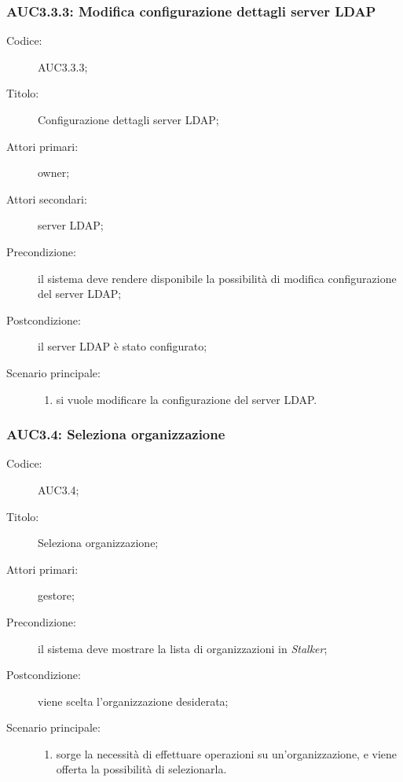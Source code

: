 \documentclass[../../../analisi-dei-requisiti.tex]{subfiles}
\begin{document}
\subsubsection{AUC3.3.3: Modifica configurazione dettagli server LDAP}%
\label{subs:AUC3.3.3}
\begin{description}
  \item[Codice:] AUC3.3.3;
  \item[Titolo:] Configurazione dettagli server LDAP\@;
  \item[Attori primari:] owner;
  \item[Attori secondari:] server LDAP\@;
  \item[Precondizione:] il sistema deve rendere disponibile la possibilità di modifica configurazione del server LDAP\@;
  \item[Postcondizione:] il server LDAP è stato configurato;
  \item[Scenario principale:]
        \begin{enumerate}
          \item si vuole modificare la configurazione del server LDAP\@.
        \end{enumerate}
\end{description}

\subsubsection{AUC3.4: Seleziona organizzazione}%
\label{subs:AUC3.4}
\begin{description}
  \item[Codice:] AUC3.4;
  \item[Titolo:] Seleziona organizzazione;
  \item[Attori primari:] gestore;
  \item[Precondizione:] il sistema deve mostrare la lista di organizzazioni in \emph{Stalker};
  \item[Postcondizione:] viene scelta l'organizzazione desiderata;
  \item[Scenario principale:]
        \begin{enumerate}
          \item sorge la necessità di effettuare operazioni su un'organizzazione, e viene offerta la possibilità di selezionarla.
        \end{enumerate}
\end{description}
\end{document}
